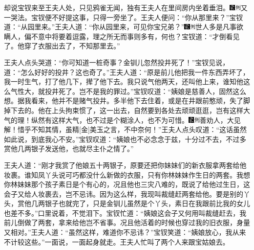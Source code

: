 却说宝钗来至王夫人处，只见鸦雀无闻，独有王夫人在里间房内坐着垂泪。{\includegraphics[width=3mm]{../Images/00006}\includegraphics[width=3mm]{../Images/00011}\footnotesize \kaishu 又一哭法。}宝钗便不好提这事，只得一旁坐了。王夫人便问：``你从那里来？''宝钗道：``从园里来。''王夫人道：``你从园里来，可见你宝兄弟？''{\includegraphics[width=3mm]{../Images/00006}\includegraphics[width=3mm]{../Images/00011}\footnotesize \kaishu 世人多是凡事欲瞒人，偏不意中将要着逗露，理之所无而事则多有，何也？}宝钗道：``才倒看见了。他穿了衣服出去了，不知那里去。''

王夫人点头哭道：``你可知道一桩奇事？金钏儿忽然投井死了！''宝钗见说，道：``怎么好好的投井？这也奇了。''王夫人道：``原是前儿他把我一件东西弄坏了，我一时生气，打了他几下，撵了他下去。我只说气他两天，还叫他上来，谁知他这么气性大，就投井死了。岂不是我的罪过。''宝钗叹道：``姨娘是慈善人，固然这么想。据我看来，他并不是赌气投井。多半他下去住着，或是在井跟前憨顽，失了脚掉下去的。他在上头拘束惯了，这一出去，自然要到各处去顽顽逛逛，岂有这样大气的理！纵然有这样大气，也不过是个糊涂人，也不为可惜。{\includegraphics[width=3mm]{../Images/00006}\includegraphics[width=3mm]{../Images/00011}\footnotesize \kaishu 善劝人，大见解！惜乎不知其情，虽精{[}金{]}美玉之言，不中奈何！}''王夫人点头叹道：``这话虽然如此说，到底我心不安。''宝钗叹道：``姨娘也不必念念于兹，十分过不去，不过多赏他几两银子发送他，也就尽主仆之情了。''

王夫人道：``刚才我赏了他娘五十两银子，原要还把你妹妹们的新衣服拿两套给他妆裹。谁知凤丫头说可巧都没什么新做的衣服，只有你林妹妹作生日的两套。我想你林妹妹那个孩子素日是个有心的，况且他也三灾八难的，既说了给他过生日，这会子又给人妆裹去，岂不忌讳。因为这么样，我现叫裁缝赶两套给他。要是别的丫头，赏他几两银子也就完了，只是金钏儿虽然是个丫头，素日在我跟前比我的女儿也差不多。''口里说着，不觉泪下。宝钗忙道：``姨娘这会子又何用叫裁缝赶去，我前儿倒做了两套，拿来给他岂不省事。况且他活着的时候也穿过我的旧衣服，身量又相对。''王夫人道：``虽然这样，难道你不忌讳？''宝钗笑道：``姨娘放心，我从来不计较这些。''一面说，一面起身就走。王夫人忙叫了两个人来跟宝姑娘去。

